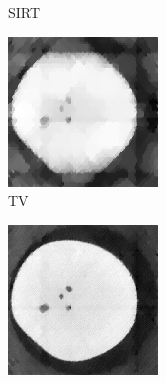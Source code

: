 \documentclass[journal]{IEEEtran}
\begin{document}
\begin{figure}[!h]
\begin{subfigure}[b]{0.24\linewidth}
        \caption{SIRT}
    \end{subfigure}
        \begin{subfigure}[b]{0.24\linewidth}
        \includegraphics[width=\textwidth]{../images/potato/post_tci/comparison/tv.png}
        \caption{TV}
     \end{subfigure}
    \begin{subfigure}[b]{0.24\linewidth}
        \includegraphics[width=\textwidth]{../images/potato/post_tci/comparison/weighted_pca_all_methods30.png}

\end{subfigure}
\end{figure}
\end{document}
